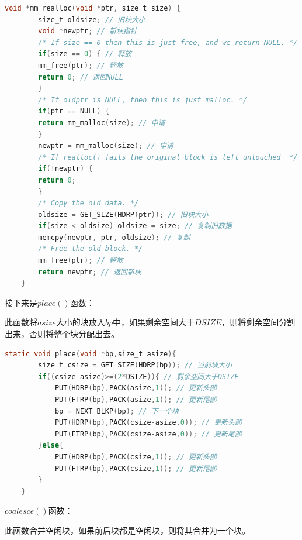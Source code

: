 \begin{lstlisting}[language = C , title = { mm\_realloc.c } ]
    void *mm_realloc(void *ptr, size_t size) {
        size_t oldsize; // 旧块大小
        void *newptr; // 新块指针
        /* If size == 0 then this is just free, and we return NULL. */
        if(size == 0) { // 释放
        mm_free(ptr); // 释放
        return 0; // 返回NULL
        }
        /* If oldptr is NULL, then this is just malloc. */
        if(ptr == NULL) {
        return mm_malloc(size); // 申请
        }
        newptr = mm_malloc(size); // 申请
        /* If realloc() fails the original block is left untouched  */
        if(!newptr) {
        return 0;
        }
        /* Copy the old data. */
        oldsize = GET_SIZE(HDRP(ptr)); // 旧块大小
        if(size < oldsize) oldsize = size; // 复制旧数据
        memcpy(newptr, ptr, oldsize); // 复制
        /* Free the old block. */
        mm_free(ptr); // 释放
        return newptr; // 返回新块
    }
\end{lstlisting}

接下来是$place()$函数：

此函数将$asize$大小的块放入$bp$中，如果剩余空间大于$DSIZE$，则将剩余空间分割出来，否则将整个块分配出去。

\begin{lstlisting}[language = C , title = { place.c } ]
    static void place(void *bp,size_t asize){
        size_t csize = GET_SIZE(HDRP(bp)); // 当前块大小
        if((csize-asize)>=(2*DSIZE)){ // 剩余空间大于DSIZE
            PUT(HDRP(bp),PACK(asize,1)); // 更新头部
            PUT(FTRP(bp),PACK(asize,1)); // 更新尾部
            bp = NEXT_BLKP(bp); // 下一个块
            PUT(HDRP(bp),PACK(csize-asize,0)); // 更新头部
            PUT(FTRP(bp),PACK(csize-asize,0)); // 更新尾部
        }else{
            PUT(HDRP(bp),PACK(csize,1)); // 更新头部
            PUT(FTRP(bp),PACK(csize,1)); // 更新尾部
        }
    }
\end{lstlisting}

$coalesce()$函数：

此函数合并空闲块，如果前后块都是空闲块，则将其合并为一个块。

